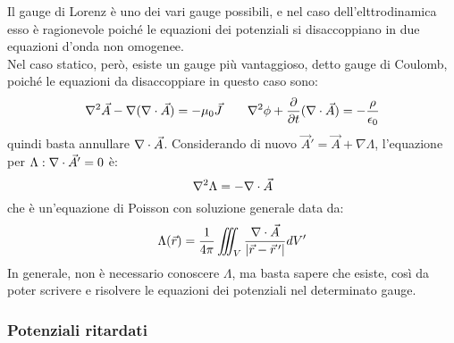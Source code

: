 \documentclass[]{article}
\begin{document}
Il gauge di Lorenz è uno dei vari gauge possibili, e nel caso dell'elttrodinamica esso è ragionevole poiché le equazioni dei potenziali si disaccoppiano in due equazioni d'onda non omogenee. \\ 
Nel caso statico, però, esiste un gauge più vantaggioso, detto gauge di Coulomb, poiché le equazioni da disaccoppiare in questo caso sono:
\begin{equation}
	\nabla^2\vec{A} - \nabla(\nabla\cdot\vec{A}) = -\mu_0 \vec{J} \qquad \nabla^2\phi + \frac{\partial}{\partial t} (\nabla\cdot\vec{A}) = -\frac{\rho}{\epsilon_0}
	\label{eq:81}
\end{equation}
quindi basta annullare $ \nabla\cdot\vec{A} $. Considerando di nuovo $ \vec{A}' = \vec{A} + \nabla\Lambda $, l'equazione per $ \Lambda : \nabla\cdot\vec{A}' = 0 $ è:
\begin{equation}
	\nabla^2 \Lambda = - \nabla\cdot\vec{A}
	\label{eq:82}
\end{equation}
che è un'equazione di Poisson con soluzione generale data da:
\begin{equation}
	\Lambda(\vec{r}) = \frac{1}{4\pi} \iiint_V \frac{\nabla\cdot\vec{A}}{\left\lvert\vec{r} - \vec{r}\,'\right\rvert} dV'
	\label{eq:83}
\end{equation}
In generale, non è necessario conoscere $ \Lambda $, ma basta sapere che esiste, così da poter scrivere e risolvere le equazioni dei potenziali nel determinato gauge.

\subsubsection{Potenziali ritardati}
\end{document}
